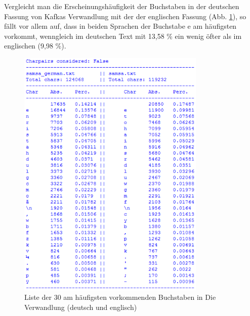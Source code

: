 



\loesung{}
Vergleicht man die Erscheinungshäufigkeit der Buchstaben in der deutschen Fassung von Kafkas Verwandlung mit der der englischen Fassung (Abb. \ref{chars}), so fällt vor allem auf, dass in beiden Sprachen der Buchstabe e am häufigsten vorkommt, wenngleich im deutschen Text mit 13,58 \% ein wenig öfter als im englischen (9,98 \%).
\begin{figure}[ht]
\begin{center}
\includegraphics[width=0.8\textwidth]{img/chars}
\caption{Liste der 30 am häufigsten vorkommenden Buchstaben in Die Verwandlung (deutsch und englisch)}
\label{chars}
\end{center}
\end{figure}

